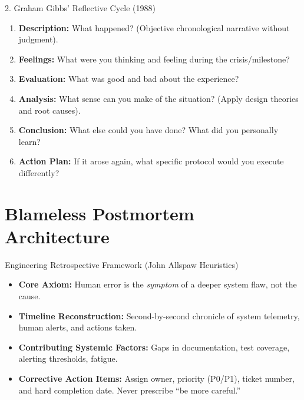 \begin{canvasbox}{2. Graham Gibbs' Reflective Cycle (1988)}
\begin{enumerate}[label=\textbf{\arabic*.}, leftmargin=2em]
    \item \textbf{Description:} What happened? (Objective chronological narrative without judgment).
    \item \textbf{Feelings:} What were you thinking and feeling during the crisis/milestone?
    \item \textbf{Evaluation:} What was good and bad about the experience?
    \item \textbf{Analysis:} What sense can you make of the situation? (Apply design theories and root causes).
    \item \textbf{Conclusion:} What else could you have done? What did you personally learn?
    \item \textbf{Action Plan:} If it arose again, what specific protocol would you execute differently?
\end{enumerate}
\end{canvasbox}

\section{Blameless Postmortem Architecture}

\begin{frameworkbox}{Engineering Retrospective Framework (John Allspaw Heuristics)}
\begin{itemize}
    \item \textbf{Core Axiom:} Human error is the \textit{symptom} of a deeper system flaw, not the cause.
    \item \textbf{Timeline Reconstruction:} Second-by-second chronicle of system telemetry, human alerts, and actions taken.
    \item \textbf{Contributing Systemic Factors:} Gaps in documentation, test coverage, alerting thresholds, fatigue.
    \item \textbf{Corrective Action Items:} Assign owner, priority (P0/P1), ticket number, and hard completion date. Never prescribe ``be more careful.''
\end{itemize}
\end{frameworkbox}
